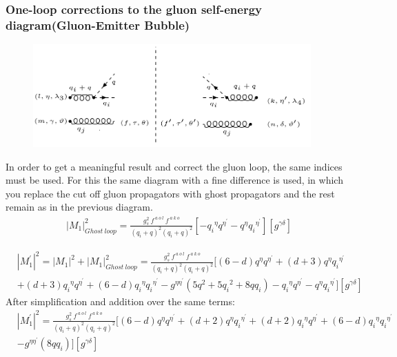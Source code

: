 \subsubsection{One-loop corrections to the gluon self-energy diagram(Gluon-Emitter Bubble)}
\begin{figure}[h!]
\centering
\includegraphics[width=0.95\textwidth]{images/GG/Ghost.png}
\end{figure}
In order to get a meaningful result and correct the gluon loop, the same indices must be used. For this the same diagram with a fine difference is used, in which you replace the cut off gluon propagators with ghost propagators and the rest remain as in the previous diagram.
\begin{equation}
\begin{split}
{{|M_1|}^2_{Ghost \:loop}}=\frac{g_s^2 \:f^{\:a\:o\:l}\: f^{\:a\:k\:o}}{(q_i +q)^2 (q_i +q)^2} [-{q_i}^{{\eta}}{q}^{{\eta}^{\prime}}-{q}^{{\eta}}{q_i}^{{\eta}^{\prime}}][g^{{\gamma}{\delta}}]
\end{split}
\end{equation}

\begin{equation}
\begin{split}
&{|{M}^{\prime}_1|}^2 = {|M_1|}^2+{{|M_1|}^2_{Ghost \:loop}}=\frac{g_s^2 \:f^{\:a\:o\:l}\: f^{\:a\:k\:o}}{(q_i +q)^2 (q_i +q)^2}  [(6-d){q}^{{\eta}}{q}^{{\eta}^{\prime}}+(d+3){q}^{{\eta}}{q_i}^{{\eta}^{\prime}}\\
&+(d+3){q_i}^{{\eta}}{q}^{{\eta}^{\prime}}+(6-d){q_i}^{{\eta}}{q_i}^{{\eta}^{\prime}}-g^{{\eta}{{\eta}^{\prime}}}(5{q}^2+5{q_i}^2+8qq_i)-{q_i}^{{\eta}}{q}^{{\eta}^{\prime}}-{q}^{{\eta}}{q_i}^{{\eta}^{\prime}}][g^{{\gamma}{\delta}}]
\end{split}
\end{equation}
After simplification and addition over the same terms:
\begin{equation}
\begin{split}
&{|{M}^{\prime}_1|}^2 =\frac{g_s^2 \:f^{\:a\:o\:l}\: f^{\:a\:k\:o}}{(q_i +q)^2 (q_i +q)^2}  [(6-d){q}^{{\eta}}{q}^{{\eta}^{\prime}}+(d+2){q}^{{\eta}}{q_i}^{{\eta}^{\prime}}+(d+2){q_i}^{{\eta}}{q}^{{\eta}^{\prime}}+(6-d){q_i}^{{\eta}}{q_i}^{{\eta}^{\prime}}\\
&-g^{{\eta}{{\eta}^{\prime}}}(8qq_i)][g^{{\gamma}{\delta}}]
\end{split}
\end{equation}

